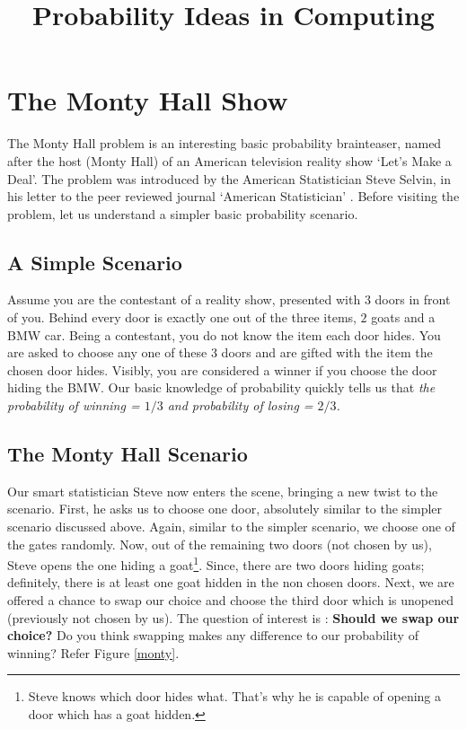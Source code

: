 \documentclass{book}
\title{Probability Ideas in Computing}
\begin{document}
\maketitle
\chapter{The Monty Hall Show}
The Monty Hall problem is an interesting basic probability brainteaser, named after the host (Monty Hall) of an American television reality show `Let's Make a Deal'. The problem was introduced by the American Statistician Steve Selvin, in his letter to the peer reviewed journal `American Statistician' \cite{selvin1975problem}. Before visiting the problem, let us understand a simpler basic probability scenario.  \\

\section{A Simple Scenario}
Assume you are the contestant of a reality show, presented with $3$ doors in front of you. Behind every door is exactly one out of the three items, $2$ goats and a BMW car. Being a contestant, you do not know the item each door hides. You are asked to choose any one of these $3$ doors and are gifted with the item the chosen door hides. Visibly, you are considered a winner if you choose the door hiding the BMW. Our basic knowledge of probability quickly tells us that \textit{the probability of winning = $1/3$ and probability of losing = $2/3$.}\\

\section{The Monty Hall Scenario}
Our smart statistician Steve now enters the scene, bringing a new twist to the scenario. First, he asks us to choose one door, absolutely similar to the simpler scenario discussed above. Again, similar to the simpler scenario, we choose one of the gates randomly. Now, out of the remaining two doors (not chosen by us), Steve opens the one hiding a goat\footnote{Steve knows which door hides what. That's why he is capable of opening a door which has a goat hidden.}. Since, there are two doors hiding goats; definitely, there is at least one goat hidden in the non chosen doors. Next, we are offered a chance to swap our choice and choose the third door which is unopened (previously not chosen by us). 
The question of interest is : \textbf{Should we swap our choice?} Do you think swapping makes any difference to our probability of winning? Refer Figure \ref{monty}. \\
\end{document}

